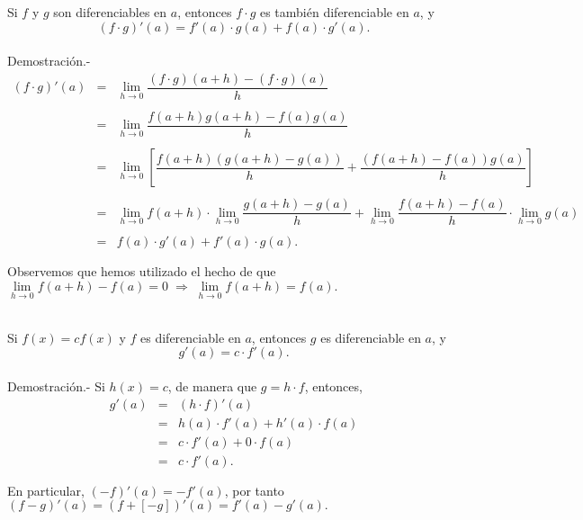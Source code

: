\begin{teo}
    Si $f$ y $g$ son diferenciables en $a$, entonces $f\cdot g$ es también diferenciable en $a$, y
    $$(f\cdot g)'(a)=f'(a)\cdot g(a)+f(a)\cdot g'(a).$$\\
	Demostración.-\; 
	$$\begin{array}{rcl}
	    (f\cdot g)'(a) &=& \lim\limits_{h\to 0} \dfrac{(f\cdot g)(a+h)-(f\cdot g)(a)}{h}\\\\
			   &=& \lim\limits_{h\to 0} \dfrac{f(a+h)g(a+h)-f(a)g(a)}{h}\\\\
			   &=& \lim\limits_{h\to 0} \left[\dfrac{f(a+h)\left(g(a+h)-g(a)\right)}{h}+\dfrac{\left(f(a+h)-f(a)\right)g(a)}{h}\right]\\\\
			   &=& \lim\limits_{h\to 0} f(a+h)\cdot \lim\limits_{h\to 0} \dfrac{g(a+h)-g(a)}{h}+\lim\limits_{h\to 0} \dfrac{f(a+h)-f(a)}{h} \cdot \lim\limits_{h\to 0} g(a)\\\\
			   &=&f(a)\cdot g'(a)+f'(a)\cdot g(a).\\\\
	\end{array}$$
	Observemos que hemos utilizado el hecho de que $\lim\limits_{h\to 0}f(a+h)-f(a)=0\; \Rightarrow \; \lim\limits_{h\to 0}f(a+h)=f(a).$\\\\
\end{teo}

\begin{teo}
    Si $f(x)=cf(x)$ y $f$ es diferenciable en $a$, entonces $g$ es diferenciable en $a$, y
    $$g'(a)=c\cdot f'(a).$$\\
	Demostración.-\; Si $h(x)=c$, de manera que $g=h\cdot f$, entonces,
	$$\begin{array}{rcl}
	    g'(a)&=&(h\cdot f)'(a)\\
		 &=&h(a)\cdot f'(a)+h'(a)\cdot f(a)\\
		 &=&c\cdot f'(a)+0\cdot f(a)\\
		 &=&c\cdot f'(a).\\\\
	\end{array}$$
	En particular, $(-f)'(a)=-f'(a)$, por tanto $(f-g)'(a)=\left(f+[-g]\right)'(a)=f'(a)-g'(a).$\\\\
\end{teo}

